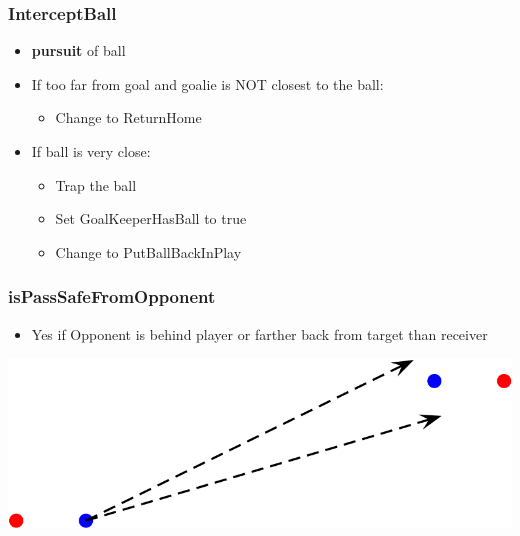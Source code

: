 \documentclass[handout,t,compress]{beamer}
\newcommand{\bframe}[1]{\begin{frame}[fragile]\frametitle{{#1}}}
\begin{document}
\bframe{InterceptBall}
\begin{itemize}
\item {\bf pursuit} of ball
\item If too far from goal and goalie is NOT closest to the ball:
\begin{itemize}
\item Change to ReturnHome
\end{itemize}
\item If ball is very close:
\begin{itemize}
\item Trap the ball
\item Set GoalKeeperHasBall to true
\item Change to PutBallBackInPlay
\end{itemize}
\end{itemize}
\end{frame}

\bframe{isPassSafeFromOpponent}
\begin{itemize}
\item Yes if Opponent is behind player or farther back from target
  than receiver
\end{itemize}
\includegraphics[scale=0.25]{behind.png}
\end{frame}
\end{document}
